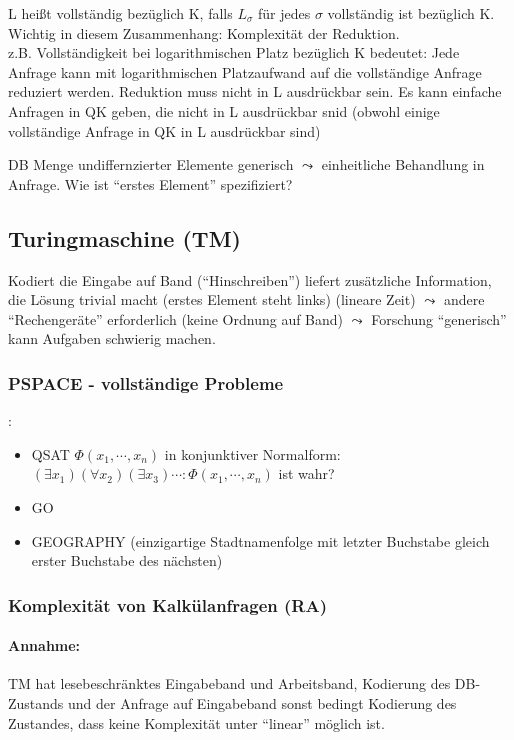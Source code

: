 \documentclass[12pt, a4paper]{article}
\begin{document}
L heißt vollständig bezüglich K, falls $L_\sigma$ für jedes $\sigma$ vollständig ist bezüglich K.
Wichtig in diesem Zusammenhang: Komplexität der Reduktion. \\

z.B. Vollständigkeit bei logarithmischen Platz bezüglich K bedeutet: Jede Anfrage kann mit logarithmischen Platzaufwand auf die vollständige Anfrage reduziert werden. Reduktion muss nicht in L ausdrückbar sein. Es kann einfache Anfragen in QK geben, die nicht in L ausdrückbar snid (obwohl einige vollständige Anfrage in QK in L ausdrückbar sind)

DB Menge undiffernzierter Elemente generisch $\leadsto$ einheitliche Behandlung in Anfrage. Wie ist ``erstes Element'' spezifiziert?

\subsection*{Turingmaschine (TM)}

Kodiert die Eingabe auf Band (``Hinschreiben'') liefert zusätzliche Information, die Lösung trivial macht (erstes Element steht links) (lineare Zeit) $\leadsto$ andere ``Rechengeräte'' erforderlich (keine Ordnung auf Band) $\leadsto$ Forschung ``generisch'' kann Aufgaben schwierig machen.

\subsubsection*{PSPACE - vollständige Probleme}: 
\begin{itemize}
\item QSAT $\Phi (x_1, \cdots, x_n)$ in konjunktiver Normalform: $(\exists x_1)(\forall x_2)(\exists x_3) \cdots : \Phi(x_1, \cdots, x_n)$ ist wahr?
\item GO
\item GEOGRAPHY (einzigartige Stadtnamenfolge mit letzter Buchstabe gleich erster Buchstabe des nächsten)
\end{itemize}

\subsubsection*{Komplexität von Kalkülanfragen (RA)}

\paragraph*{Annahme:} TM hat lesebeschränktes Eingabeband und Arbeitsband, Kodierung des DB-Zustands und der Anfrage auf Eingabeband sonst bedingt Kodierung des Zustandes, dass keine Komplexität unter ``linear'' möglich ist.
\end{document}
